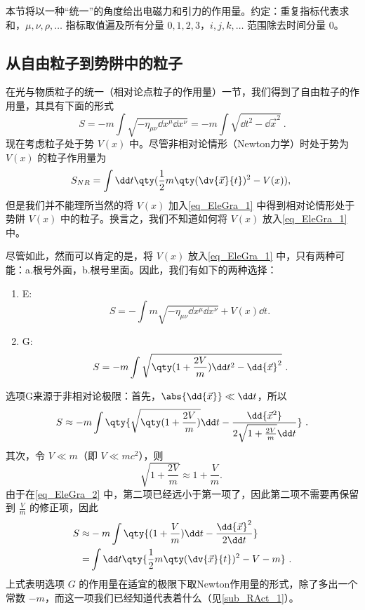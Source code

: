 
本节将以一种“统一”的角度给出电磁力和引力的作用量。约定：重复指标代表求和，$\mu,\nu,\rho,\ldots$ 指标取值遍及所有分量 $0,1,2,3$，$i,j,k,\ldots$ 范围除去时间分量 $0$。 
\subsection{从自由粒子到势阱中的粒子}
在光与物质粒子的统一（相对论点粒子的作用量）一节，我们得到了自由粒子的作用量，其具有下面的形式
\begin{equation}\label{eq_EleGra_1}
S=-m\int\sqrt{-\eta_{\mu\nu}\dd x^\mu\dd x^\nu}=-m\int\sqrt{\dd t^2-\dd{\vec x}^2}~.
\end{equation}
现在考虑粒子处于势 $V(x)$ 中。尽管非相对论情形（Newton力学）时处于势为 $V(x)$ 的粒子作用量为
\begin{equation}
S_{NR}=\int\dd t\qty(\frac{1}{2}m\qty(\dv{\vec x}{t})^2-V(x)),~
\end{equation}
但是我们并不能理所当然的将 $V(x)$ 加入\autoref{eq_EleGra_1} 中得到相对论情形处于势阱 $V(x)$ 中的粒子。换言之，我们不知道如何将 $V(x)$ 放入\autoref{eq_EleGra_1} 中。

尽管如此，然而可以肯定的是，将 $V(x)$ 放入\autoref{eq_EleGra_1} 中，只有两种可能：a.根号外面，b.根号里面。因此，我们有如下的两种选择：
\begin{enumerate}
\item E:
\begin{equation}
S=-\int{m\sqrt{-\eta_{\mu\nu}\dd x^\mu\dd x^\nu}+V(x)\dd t}.~
\end{equation}
\item G:
\begin{equation}\label{eq_EleGra_4}
S=-m\int\sqrt{\qty(1+\frac{2V}{m})\dd t^2-\dd{\vec x}^2}~.
\end{equation}
\end{enumerate}
选项G来源于非相对论极限：首先，$\abs{\dd{\vec x}}\ll \dd t$，所以
\begin{equation}\label{eq_EleGra_2}
S\approx-m\int \qty{\sqrt{\qty(1+\frac{2V}{m})}\dd t-\frac{\dd{\vec{x}^2}}{2\sqrt{1+\frac{2V}{m}}\dd t}}~.
\end{equation}
其次，令 $V\ll m$（即 $V\ll mc^2$），则
\begin{equation}
\sqrt{1+\frac{2V}{m}}\approx1+\frac{V}{m}.~
\end{equation}
由于在\autoref{eq_EleGra_2} 中，第二项已经远小于第一项了，因此第二项不需要再保留到 $\frac{V}{m}$ 的修正项，因此
\begin{equation}
\begin{aligned}
S\approx&-m\int \qty{(1+\frac{V}{m})\dd t-\frac{\dd{\vec x}^2}{2\dd t}}\\
=&\int \dd t\qty{\frac{1}{2}m\qty(\dv{\vec x}{t})^2-V-m}~.
\end{aligned}
\end{equation}
上式表明选项 $G$ 的作用量在适宜的极限下取Newton作用量的形式，除了多出一个常数 $-m$，而这一项我们已经知道代表着什么（见\autoref{sub_RAct_1}）。

